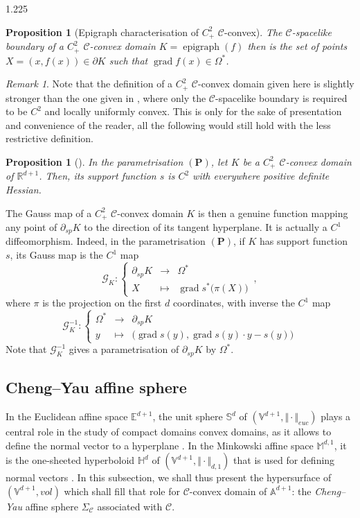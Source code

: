 \documentclass[reqno, a4paper]{amsart}
\numberwithin{equation}{section}
\numberwithin{figure}{section}
\newtheorem{proposition}[theorem]{Proposition}
\theoremstyle{definition}
\theoremstyle{remark}
\newtheorem{remark}[theorem]{Remark}
\newcommand{\R}{\mathbb{R}} %
\newcommand{\V}{\mathbb{V}} %
\newcommand{\A}{\mathbb{A}} %
\newcommand{\E}{\mathbb{E}} %
\newcommand{\Sph}{\mathbb{S}} %
\newcommand{\M}{\mathbb{M}} %
\renewcommand{\H}{\mathbb{H}} %
\DeclareMathOperator{\grad}{grad} %
\DeclareMathOperator{\epi}{epigraph} %
\newcommand{\C}{\mathcal{C}} %
\renewcommand{\S}{\Sigma_\C} %
\newcommand{\G}{\mathcal{G}} %
\newcommand{\linvol}{\mathit{vol}} %
\newcommand{\namelessfunction}[4]{ \left\lbrace \begin{matrix}
{#1} &\longrightarrow& {#2}\\
{#3} & \longmapsto & {#4}
\end{matrix} \right. }
\newcommand{\function}[5]{{#1}: \namelessfunction{#2}{#3}{#4}{#5}}
\newcommand{\bp}[1]{{\bigl( {#1} \bigr)}} %
\begin{document}
\begin{spacing}{1.225}
\begin{proposition}[Epigraph characterisation of $C^2_+$ $\C$-convex]
The $\C$-spacelike boundary of a $C^2_+$ $\C$-convex domain $K = \epi(f)$ then is the set of points $X=(x,f(x)) \in \partial K$ such that $\grad f(x) \in \Omega^*$.
\end{proposition}

\begin{remark}
Note that the definition of a $C^2_+$ $\C$-convex domain given here is slightly stronger than the one given in \cite{Ablondi_25}, where only the $\C$-spacelike boundary is required to be $C^2$ and locally uniformly convex. This is only for the sake of presentation and convenience of the reader, all the following would still hold with the less restrictive definition. 
\end{remark}

\begin{proposition}[{\cite[Propositions 4.11]{Ablondi_25}}]
\label{prop K is epigraph C2+}
In the parametrisation $(\mathbf{P})$, let $K$ be a $C^2_+$ $\C$-convex domain of $\R^{d+1}$. Then, its support function $s$ is $C^2$ with everywhere positive definite Hessian.
\end{proposition}

The Gauss map of a $C^2_+$ $\C$-convex domain $K$ is then a genuine function mapping any point of $\partial_{sp}K$ to the direction of its tangent hyperplane. It is actually a $C^1$ diffeomorphism. Indeed, in the parametrisation $(\mathbf{P})$, if $K$ has support function $s$, its Gauss map is the $C^1$ map
\begin{equation*}
\label{eq expression of the Gauss map}
\function{\G_{K}}{\partial_{sp} K}{\Omega^*}{X}{\grad s^*\bp{\pi(X)}} \, ,
\end{equation*}
where $\pi$ is the projection on the first $d$ coordinates, with inverse the $C^1$ map
\begin{equation}
\label{eq expression of the inverse of the Gauss map}
\function{\G_{K}^{-1}}{\Omega^*}{\partial_{sp} K}{y}{\bp{\grad s(y) , \grad s(y) \cdot y -s (y)}} 
\end{equation}
Note that $\G_{K}^{-1}$ gives a parametrisation of $\partial_{sp}K$ by $\Omega^*$. 

\subsection{Cheng--Yau affine sphere}
\label{subsec Cheng-Yau affine sphere}

In the Euclidean affine space $\E^{d+1}$, the unit sphere $\Sph^{d}$ of $(\V^{d+1},\Vert\cdot\Vert_{euc})$ plays a central role in the study of compact domains convex domains, as it allows to define the normal vector to a hyperplane \cite{Schneider_93}. In the Minkowski affine space $\M^{d,1}$, it is the one-sheeted hyperboloid $\H^{d}$ of $(\V^{d+1},\Vert\cdot\Vert_{d,1})$ that is used for defining normal vectors \cite{Fillastre_Veronelli_16}. In this subsection, we shall thus present the hypersurface of $(\V^{d+1},\linvol)$ which shall fill that role for $\C$-convex domain of $\A^{d+1}$: the \emph{Cheng--Yau} affine sphere $\S$ associated with $\C$.


\end{spacing}
\end{document}
